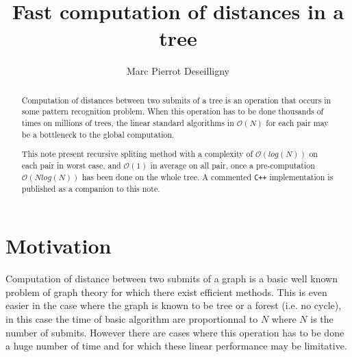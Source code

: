 \documentclass[a4paper]{article}
\begin{document}

\title{Fast computation of distances in a tree}
\author[1]{Marc Pierrot Deseilligny}


\maketitle 

\begin{abstract}
   Computation of distances between two submits of a tree is an operation that occurs in some
pattern recognition problem. When this operation has to be done thousands of times on millions
of trees, the linear standard  algorithms in $\mathcal{O}(N)$ for each pair
    may be a bottleneck to the global computation.

   This note present recursive spliting method with a complexity of $\mathcal{O}(log(N))$ on each pair
   in worst case, and $\mathcal{O}(1)$ in average on all pair, once a pre-computation $\mathcal{O}(N log(N))$
   has been done on the whole tree. A commented {\tt C++} implementation is published as a companion to this note.
\end{abstract}



\section{Motivation}

Computation of distance between two submits of a graph is  a basic well known
problem of graph theory for which there exist efficient methods. This is even  easier in 
the case where the graph is known to be tree or a forest (i.e. no cycle), in this case
the time of basic algorithm are proportionnal to $N$ where $N$ is the number of
submits. However there are cases where this operation has to be done a huge
number of time and for which these linear performance may be limitative.
\end{document}
